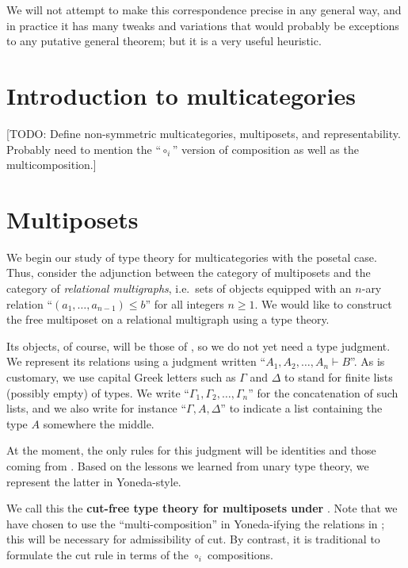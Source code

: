 \documentclass{book}
\let\types\vdash
\begin{document}
We will not attempt to make this correspondence precise in any general way, and in practice it has many tweaks and variations that would probably be exceptions to any putative general theorem; but it is a very useful heuristic.


\section{Introduction to multicategories}
\label{sec:multicats-catth}

[TODO: Define non-symmetric multicategories, multiposets, and representability.
Probably need to mention the ``$\circ_i$'' version of composition as well as the multicomposition.]


\section{Multiposets}
\label{sec:multiposets}

We begin our study of type theory for multicategories with the posetal case.
Thus, consider the adjunction between the category \bMPos of multiposets and the category \bRelMGr of \emph{relational multigraphs}, i.e.\ sets of objects equipped with an $n$-ary relation ``$(a_1,\dots,a_{n-1})\le b$'' for all integers $n\ge 1$.
We would like to construct the free multiposet on a relational multigraph \cG using a type theory.

Its objects, of course, will be those of \cG, so we do not yet need a type judgment.
We represent its relations using a judgment written ``$A_1,A_2,\dots,A_n \types B$''.
As is customary, we use capital Greek letters such as $\Gamma$ and $\Delta$ to stand for finite lists (possibly empty) of types.
We write ``$\Gamma_1,\Gamma_2,\dots,\Gamma_n$'' for the concatenation of such lists, and we also write for instance ``$\Gamma,A,\Delta$'' to indicate a list containing the type $A$ somewhere the middle.

At the moment, the only rules for this judgment will be identities and those coming from \cG.
Based on the lessons we learned from unary type theory, we represent the latter in Yoneda-style.
We call this the \textbf{cut-free type theory for multiposets under \cG}.
Note that we have chosen to use the ``multi-composition'' in Yoneda-ifying the relations in \cG; this will be necessary for admissibility of cut.
By contrast, it is traditional to formulate the cut rule in terms of the $\circ_i$ compositions.
\end{document}
